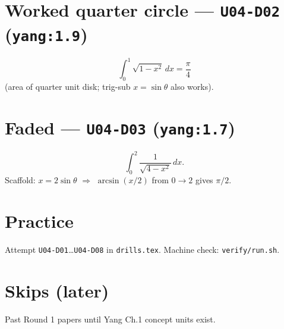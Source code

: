 \section{Worked quarter circle --- \texttt{U04-D02} (\texttt{yang:1.9})}
\[
\int_0^1\sqrt{1-x^2}\,dx = \frac\pi4
\]
(area of quarter unit disk; trig-sub $x=\sin\theta$ also works).

\section{Faded --- \texttt{U04-D03} (\texttt{yang:1.7})}
\[
\int_0^2\frac{1}{\sqrt{4-x^2}}\,dx.
\]
Scaffold: $x=2\sin\theta$ $\Rightarrow$ $\arcsin(x/2)$ from $0\to2$ gives $\pi/2$.


\section{Practice}
Attempt \texttt{U04-D01}\ldots\texttt{U04-D08} in \texttt{drills.tex}.
Machine check: \texttt{verify/run.sh}.

\section{Skips (later)}
Past Round 1 papers until Yang Ch.1 concept units exist.

